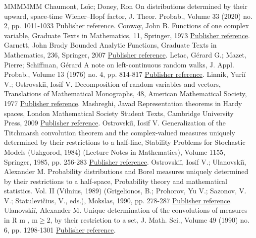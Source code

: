 \begin{thebibliography}{MMMMMM}
 Chaumont, Loïc; Doney, Ron On distributions determined by their upward, space-time Wiener–Hopf factor, J. Theor. Probab., Volume 33 (2020) no. 2, pp. 1011-1033 \href{https://ahl.centre-mersenne.org/item/AHL_2020__3__1389_0/#bib:cd17}{Publisher reference}.
 Conway, John B. Functions of one complex variable, Graduate Texts in Mathematics, 11, Springer, 1973 \href{https://ahl.centre-mersenne.org/item/AHL_2020__3__1389_0/#bib:c73}{Publisher reference}.
 Garnett, John Brady Bounded Analytic Functions, Graduate Texts in Mathematics, 236, Springer, 2007 \href{https://ahl.centre-mersenne.org/item/AHL_2020__3__1389_0/#bib:g07}{Publisher reference}.
 Letac, Gérard G.; Mazet, Pierre; Schiffman, Gérard A note on left-continuous random walks, J. Appl. Probab., Volume 13 (1976) no. 4, pp. 814-817 \href{https://ahl.centre-mersenne.org/item/AHL_2020__3__1389_0/#bib:lms76}{Publisher reference}.
 Linnik, Yuriĭ V.; Ostrovskiĭ, Iosif V. Decomposition of random variables and vectors, Translations of Mathematical Monographs, 48, American Mathematical Society, 1977 \href{https://ahl.centre-mersenne.org/item/AHL_2020__3__1389_0/#bib:lo77}{Publisher reference}.
 Mashreghi, Javad Representation theorems in Hardy spaces, London Mathematical Society Student Texts, Cambridge University Press, 2009 \href{https://ahl.centre-mersenne.org/item/AHL_2020__3__1389_0/#bib:m09}{Publisher reference}.
 Ostrovskiĭ, Iosif V. Generalization of the Titchmarsh convolution theorem and the complex-valued measures uniquely determined by their restrictions to a half-line, Stability Problems for Stochastic Models (Uzhgorod, 1984) (Lecture Notes in Mathematics), Volume 1155, Springer, 1985, pp. 256-283 \href{https://ahl.centre-mersenne.org/item/AHL_2020__3__1389_0/#bib:o85}{Publisher reference}.
 Ostrovskiĭ, Iosif V.; Ulanovskiĭ, Alexander M. Probability distributions and Borel measures uniquely determined by their restrictions to a half-space, Probability theory and mathematical statistics. Vol. II (Vilnius, 1989) (Grigelionos, B.; Prohorov, Yu V.; Sazonov, V. V.; Statulevičius, V., eds.), Mokslas, 1990, pp. 278-287 \href{https://ahl.centre-mersenne.org/item/AHL_2020__3__1389_0/#bib:ou90}{Publisher reference}.
 Ulanovskiĭ, Alexander M. Unique determination of the convolutions of measures in R m , m\(\geqslant\)2, by their restriction to a set, J. Math. Sci., Volume 49 (1990) no. 6, pp. 1298-1301 \href{https://ahl.centre-mersenne.org/item/AHL_2020__3__1389_0/#bib:u90}{Publisher reference}.

\end{thebibliography}
